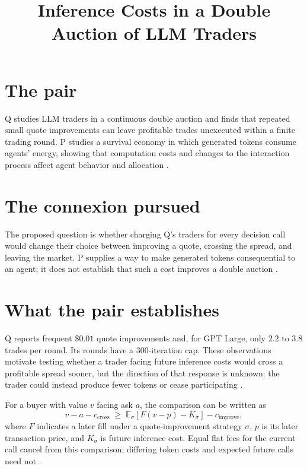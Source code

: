 \documentclass{article}
\title{Inference Costs in a Double Auction of LLM Traders}
\begin{document}
\maketitle

\section*{The pair}

Q studies LLM traders in a continuous double auction and finds that repeated small quote improvements can leave profitable trades unexecuted within a finite trading round. P studies a survival economy in which generated tokens consume agents' energy, showing that computation costs and changes to the interaction process affect agent behavior and allocation .

\section*{The connexion pursued}

The proposed question is whether charging Q's traders for every decision call would change their choice between improving a quote, crossing the spread, and leaving the market. P supplies a way to make generated tokens consequential to an agent; it does not establish that such a cost improves a double auction .

\section*{What the pair establishes}

Q reports frequent \(\$0.01\) quote improvements and, for GPT Large, only \(2.2\) to \(3.8\) trades per round. Its rounds have a \(300\)-iteration cap. These observations motivate testing whether a trader facing future inference costs would cross a profitable spread sooner, but the direction of that response is unknown: the trader could instead produce fewer tokens or cease participating .

For a buyer with value \(v\) facing ask \(a\), the comparison can be written as
\[
v-a-c_{\mathrm{cross}}
\;\geq\;
\mathbb{E}_{\sigma}\!\left[F(v-p)-K_{\sigma}\right]
-c_{\mathrm{improve}},
\]
where \(F\) indicates a later fill under a quote-improvement strategy \(\sigma\), \(p\) is its later transaction price, and \(K_{\sigma}\) is future inference cost. Equal flat fees for the current call cancel from this comparison; differing token costs and expected future calls need not .
\end{document}
